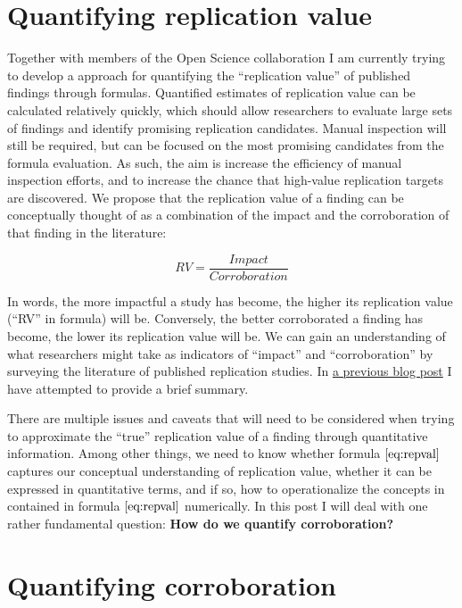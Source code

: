 \documentclass[]{article}
\begin{document}
\hypertarget{quantifying-replication-value}{%
\section{Quantifying replication
value}\label{quantifying-replication-value}}

Together with members of the Open Science collaboration I am currently
trying to develop a approach for quantifying the ``replication value''
of published findings through formulas. Quantified estimates of
replication value can be calculated relatively quickly, which should
allow researchers to evaluate large sets of findings and identify
promising replication candidates. Manual inspection will still be
required, but can be focused on the most promising candidates from the
formula evaluation. As such, the aim is increase the efficiency of
manual inspection efforts, and to increase the chance that high-value
replication targets are discovered. We propose that the replication
value of a finding can be conceptually thought of as a combination of
the impact and the corroboration of that finding in the literature:

\[
\begin{equation}
RV=\frac{Impact}{Corroboration}
\label{eq:repval}
\tag{1}
\end{equation}
\]

In words, the more impactful a study has become, the higher its
replication value (``RV'' in formula) will be. Conversely, the better
corroborated a finding has become, the lower its replication value will
be. We can gain an understanding of what researchers might take as
indicators of ``impact'' and ``corroboration'' by surveying the
literature of published replication studies. In
\href{https://pedermisager.netlify.com/post/what-to-replicate/}{a
previous blog post} I have attempted to provide a brief summary.

There are multiple issues and caveats that will need to be considered
when trying to approximate the ``true'' replication value of a finding
through quantitative information. Among other things, we need to know
whether formula \(\eqref{eq:repval}\) captures our conceptual
understanding of replication value, whether it can be expressed in
quantitative terms, and if so, how to operationalize the concepts in
contained in formula \(\eqref{eq:repval}\) numerically. In this post I
will deal with one rather fundamental question: \textbf{How do we
quantify corroboration?}

\hypertarget{quantifying-corroboration}{%
\section{Quantifying corroboration}\label{quantifying-corroboration}}
\end{document}
